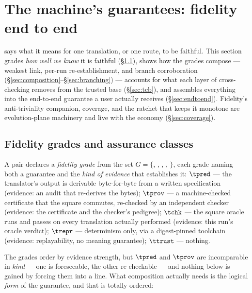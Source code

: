 
\section{The machine's guarantees: fidelity end to end}
\label{sec:fidelity}

 says what it means for one translation, or one route,
to be faithful. This section grades \emph{how well we know} it is
faithful (\S\ref{sec:grades}), shows how the grades compose --- weakest
link, per-run re-establishment, and branch corroboration
(\S\ref{sec:composition}--\S\ref{sec:branching}) --- accounts for what
each layer of cross-checking removes from the trusted base
(\S\ref{sec:tcb}), and assembles everything into the
end-to-end guarantee a user actually receives (\S\ref{sec:endtoend}).
Fidelity's anti-triviality companion, coverage, and the ratchet that
keeps it monotone are evolution-plane machinery and live with the
economy (\S\ref{sec:coverage}).

\subsection{Fidelity grades and assurance classes}
\label{sec:grades}

A pair declares a \emph{fidelity grade} from the set
$G = \{$\ttrust, \trepr, \tchk, \tpred, \tprov$\}$,
each grade naming both a guarantee and the \emph{kind of evidence} that
establishes it: $\tpred$ --- the translator's output is derivable
byte-for-byte from a written specification (evidence: an audit that
re-derives the bytes); $\tprov$ --- a machine-checked certificate that the
square commutes, re-checked by an independent checker (evidence: the
certificate and the checker's pedigree); $\tchk$ --- the square oracle
runs and passes on every translation actually performed (evidence:
this run's oracle verdict); $\trepr$ --- determinism only, via a
digest-pinned toolchain (evidence: replayability, no meaning guarantee);
$\ttrust$ --- nothing.

The grades order by evidence strength, but $\tpred$ and $\tprov$ are
incomparable in \emph{kind} --- one is foreseeable, the other
re-checkable --- and nothing below is gained by forcing them into a line.
What composition actually needs is the logical \emph{form} of the
guarantee, and that is totally ordered:

